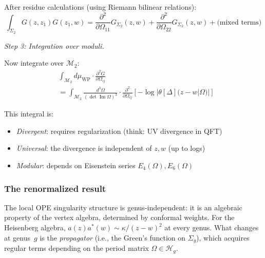 After residue calculations (using Riemann bilinear relations):
\[\int_{\Sigma_2} G(z, z_1) G(z_1, w) =
\frac{\partial^2}{\partial \Omega_{11}} G_{\Sigma_2}(z, w)
+ \frac{\partial^2}{\partial \Omega_{22}} G_{\Sigma_2}(z, w)
+ \text{(mixed terms)}\]

\emph{Step 3: Integration over moduli.}

Now integrate over $\mathcal{M}_2$:
\begin{align}
&\int_{\mathcal{M}_2} d\mu_{\text{WP}} \cdot
\frac{\partial^2 G}{\partial \Omega_{ij}} \\
&= \int_{\mathcal{M}_2} \frac{d^3\Omega}{(\det \operatorname{Im} \Omega)^{3}}
\cdot \frac{\partial^2}{\partial \Omega_{ij}}
\left[ -\log|\theta[\Delta](z-w|\Omega)| \right]
\end{align}

This integral is:
\begin{itemize}
\item \emph{Divergent}: requires regularization (think: UV divergence in QFT)
\item \emph{Universal}: the divergence is independent of $z, w$ (up to logs)
\item \emph{Modular}: depends on Eisenstein series $E_4(\Omega), E_6(\Omega)$
\end{itemize}

\subsubsection{The renormalized result}

\begin{remark}\label{rem:ope-genus-independent}
The local OPE singularity structure is genus-independent: it is an algebraic property
of the vertex algebra, determined by conformal weights. For the Heisenberg algebra,
$a(z)a^*(w) \sim \kappa/(z-w)^2$ at every genus. What changes at genus~$g$ is the
\emph{propagator} (i.e., the Green's function on $\Sigma_g$), which acquires regular
terms depending on the period matrix $\Omega \in \mathcal{H}_g$.
\end{remark}

